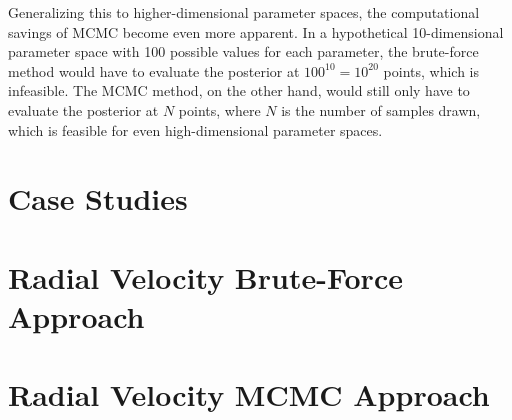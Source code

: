 \documentclass[preprint,longauthor]{aastex631}
\numberwithin{equation}{section}
\begin{document}
Generalizing this to higher-dimensional parameter spaces, the computational savings of MCMC become even more apparent. In a hypothetical 10-dimensional parameter space with 100 possible values for each parameter, the brute-force method would have to evaluate the posterior at $100^{10} = 10^{20}$ points, which is infeasible. The MCMC method, on the other hand, would still only have to evaluate the posterior at $N$ points, where $N$ is the number of samples drawn, which is feasible for even high-dimensional parameter spaces.

\section{Case Studies}
\label{sec:CaseStudies}

\appendix
\section[Appendix A]{Radial Velocity Brute-Force Approach}
\label{appx:A}



\section[Appendix B]{Radial Velocity MCMC Approach}
\label{appx:B}




\end{document}
